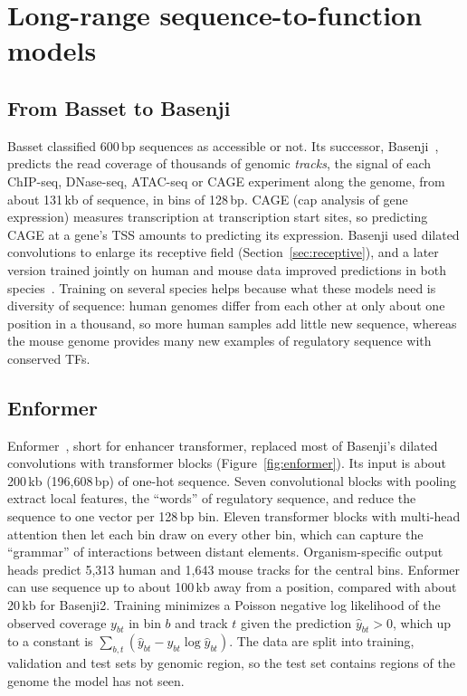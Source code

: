 \section{Long-range sequence-to-function models}
\label{sec:enformer}

\subsection{From Basset to Basenji}

Basset classified 600\,bp sequences as accessible or not. Its successor, Basenji~\citep{kelley2018}, predicts the read coverage of thousands of genomic \emph{tracks}, the signal of each ChIP-seq, DNase-seq, ATAC-seq or CAGE experiment along the genome, from about 131\,kb of sequence, in bins of 128\,bp. CAGE (cap analysis of gene expression) measures transcription at transcription start sites, so predicting CAGE at a gene's TSS amounts to predicting its expression. Basenji used dilated convolutions to enlarge its receptive field (Section~\ref{sec:receptive}), and a later version trained jointly on human and mouse data improved predictions in both species~\citep{kelley2020}. Training on several species helps because what these models need is diversity of sequence: human genomes differ from each other at only about one position in a thousand, so more human samples add little new sequence, whereas the mouse genome provides many new examples of regulatory sequence with conserved TFs.

\subsection{Enformer}

Enformer~\citep{avsec2021}, short for enhancer transformer, replaced most of Basenji's dilated convolutions with transformer blocks (Figure~\ref{fig:enformer}). Its input is about 200\,kb (196,608\,bp) of one-hot sequence. Seven convolutional blocks with pooling extract local features, the ``words'' of regulatory sequence, and reduce the sequence to one vector per 128\,bp bin. Eleven transformer blocks with multi-head attention then let each bin draw on every other bin, which can capture the ``grammar'' of interactions between distant elements. Organism-specific output heads predict 5,313 human and 1,643 mouse tracks for the central bins. Enformer can use sequence up to about 100\,kb away from a position, compared with about 20\,kb for Basenji2. Training minimizes a Poisson negative log likelihood of the observed coverage $y_{bt}$ in bin $b$ and track $t$ given the prediction $\hat y_{bt}>0$, which up to a constant is $\sum_{b,t}(\hat y_{bt}-y_{bt}\log\hat y_{bt})$. The data are split into training, validation and test sets by genomic region, so the test set contains regions of the genome the model has not seen.

